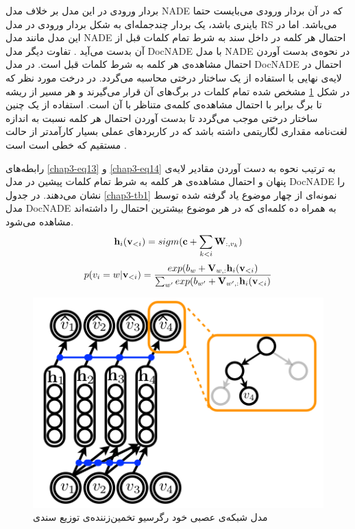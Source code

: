  بردار ورودی در این مدل بر خلاف مدل
NADE
که در آن بردار ورودی می‌‌بایست حتما باینری باشد، یک بردار چندجمله‌ای به شکل بردار ورودی در مدل
RS
می‌باشد. اما در این مدل مانند مدل
NADE
احتمال هر کلمه در داخل سند به شرط تمام کلمات قبل از آن بدست می‌‌آید
\cite{larochelle2012neural}.
 تفاوت دیگر مدل
DocNADE
با مدل
NADE
در نحوه‌ی بدست آوردن احتمال مشاهده‌ی هر کلمه به شرط کلمات قبل است. در مدل
DocNADE
احتمال در لایه‌ی نهایی با استفاده از یک ساختار درختی محاسبه می‌‌گردد. در درخت مورد نظر که در شکل
\ref{chap3-fig7}
مشخص شده تمام کلمات در برگ‌های آن قرار می‌‌گیرند و هر مسیر از ریشه تا برگ برابر با احتمال مشاهده‌ی ‌کلمه‌ی متناظر با آن است. استفاده از یک چنین ساختار درختی موجب می‌‌گردد تا بدست آوردن احتمال هر کلمه نسبت به اندازه لغت‌نامه مقداری لگاریتمی داشته باشد که در کاربرد‌های عملی‌ بسیار کارآمدتر از حالت مستقیم که خطی‌ است است
\cite{larochelle2012neural}.

رابطه‌های
\ref{chap3-eq13}
و
\ref{chap3-eq14}
به ترتیب نحوه به دست آوردن مقادیر لایه‌ی پنهان و احتمال مشاهده‌ی هر کلمه به شرط تمام کلمات پیشین در مدل
DocNADE
 را نشان می‌‌دهند. در جدول
\ref{chap3-tb1}
نمونه‌ای از چهار موضوع یاد گرفته شده توسط مدل
DocNADE
به همراه ده کلمه‌ای‌ که در هر موضوع بیشترین احتمال را داشته‌اند مشاهده می‌شود.
\begin{align}
\centering
\textbf{h}_i(\textbf{v}_{<i}) = sigm(\textbf{c}+\sum_{k<i}\textbf{W}_{:,v_k})
\label{chap3-eq13}
\end{align}
\begin{align}
\centering
p(v_i=w|\textbf{v}_{<i}) = \frac{exp(b_w +\textbf{V}_{w,:}\textbf{h}_i(\textbf{v}_{<i})}{\sum_{w'}exp(b_{w'}+\textbf{V}_{w',:}\textbf{h}_i(\textbf{v}_{<i})}
\label{chap3-eq14}
\end{align}
  \begin{figure}[!t]
  	\centering
  	\includegraphics[scale=0.4]{chap3-img/DocNADE}
  	\caption{مدل شبکه‌‌ی عصبی خود رگرسیو تخمین‌زننده‌ی توزیع سندی \cite{larochelle2012neural}}
  	\label{chap3-fig7}
  \end{figure}

